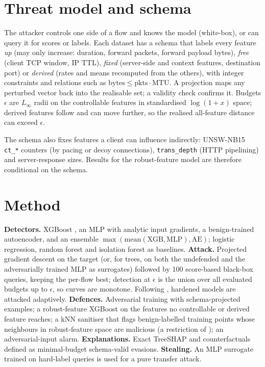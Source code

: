 \documentclass[11pt]{article}
\begin{document}
\section{Threat model and schema}
The attacker controls one side of a flow and knows the model (white-box), or can query it for
scores or labels. Each dataset has a schema that labels every feature \emph{up} (may only
increase: duration, forward packets, forward payload bytes), \emph{free} (client TCP window,
IP TTL), \emph{fixed} (server-side and context features, destination port) or \emph{derived}
(rates and means recomputed from the others), with integer constraints and relations such as
$\text{bytes} \le \text{pkts}\cdot\text{MTU}$. A projection maps any perturbed vector back into
the realisable set; a validity check confirms it. Budgets $\epsilon$ are $L_\infty$ radii on the
controllable features in standardised $\log(1+x)$ space; derived features follow and can move
further, so the realised all-feature distance can exceed $\epsilon$.

The schema also fixes features a client can influence indirectly: UNSW-NB15 \texttt{ct\_*}
counters (by pacing or decoy connections), \texttt{trans\_depth} (HTTP pipelining) and
server-response sizes. Results for the robust-feature model are therefore conditional on the
schema.

\section{Method}
\textbf{Detectors.} XGBoost \cite{chen2016}, an MLP with analytic input gradients, a
benign-trained autoencoder, and an ensemble $\max(\text{mean}(\text{XGB},\text{MLP}),\text{AE})$;
logistic regression, random forest and isolation forest as baselines.
\textbf{Attack.} Projected gradient descent \cite{madry2018} on the target (or, for trees, on
both the undefended and the adversarially trained MLP as surrogates) followed by 100 score-based
black-box queries, keeping the per-flow best; detection at $\epsilon$ is the union over all
evaluated budgets up to $\epsilon$, so curves are monotone. Following \cite{tramer2020}, hardened
models are attacked adaptively.
\textbf{Defences.} Adversarial training with schema-projected examples; a robust-feature XGBoost
on the features no controllable or derived feature reaches; a kNN sanitiser that flags
benign-labelled training points whose neighbours in robust-feature space are malicious
(a restriction of \cite{paudice2018}); an adversarial-input alarm.
\textbf{Explanations.} Exact TreeSHAP \cite{lundberg2020} and counterfactuals defined as
minimal-budget schema-valid evasions.
\textbf{Stealing.} An MLP surrogate trained on hard-label queries \cite{tramer2016} is used for a
pure transfer attack.
\end{document}
